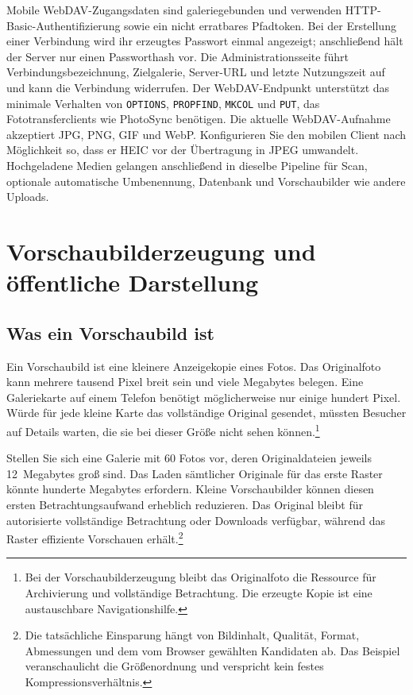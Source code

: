 \documentclass[11pt,a4paper]{article}
\newcommand{\codeword}[1]{\nolinkurl{#1}}
\begin{document}
Mobile WebDAV-Zugangsdaten sind galeriegebunden und verwenden
HTTP-Basic-Authen\-tifizierung sowie ein nicht erratbares Pfadtoken. Bei der
Erstellung einer Verbindung wird ihr erzeugtes Passwort einmal angezeigt;
anschließend hält der Server nur einen Passworthash vor. Die
Administrationsseite führt Verbindungsbezeichnung, Zielgalerie, Server-URL und
letzte Nutzungszeit auf und kann die Verbindung widerrufen. Der WebDAV-Endpunkt
unterstützt das minimale Verhalten von \codeword{OPTIONS}, \codeword{PROPFIND},
\codeword{MKCOL} und \codeword{PUT}, das Fototransferclients wie PhotoSync
benötigen. Die aktuelle WebDAV-Aufnahme akzeptiert JPG, PNG, GIF und WebP.
Konfigurieren Sie den mobilen Client nach Möglichkeit so, dass er HEIC vor der
Übertragung in JPEG umwandelt. Hochgeladene Medien gelangen anschließend in
dieselbe Pipeline für Scan, optionale automatische Umbenennung, Datenbank und
Vorschaubilder wie andere Uploads.
\section{Vorschaubilderzeugung und öffentliche Darstellung}
\label{sec:thumbnails}

\subsection{Was ein Vorschaubild ist}

Ein Vorschaubild ist eine kleinere Anzeigekopie eines Fotos. Das Originalfoto
kann mehrere tausend Pixel breit sein und viele Megabytes belegen. Eine
Galeriekarte auf einem Telefon benötigt möglicherweise nur einige hundert Pixel.
Würde für jede kleine Karte das vollständige Original gesendet, müssten Besucher
auf Details warten, die sie bei dieser Größe nicht sehen können.\footnote{Bei
der Vorschaubilderzeugung bleibt das Originalfoto die Ressource für Archivierung
und vollständige Betrachtung. Die erzeugte Kopie ist eine austauschbare
Navigationshilfe.}

Stellen Sie sich eine Galerie mit 60 Fotos vor, deren Originaldateien jeweils
12~Megabytes groß sind. Das Laden sämtlicher Originale für das erste Raster
könnte hunderte Megabytes erfordern. Kleine Vorschaubilder können diesen ersten
Betrachtungsaufwand erheblich reduzieren. Das Original bleibt für autorisierte
vollständige Betrachtung oder Downloads verfügbar, während das Raster effiziente
Vorschauen erhält.\footnote{Die tatsächliche Einsparung hängt von Bildinhalt,
Qualität, Format, Abmessungen und dem vom Browser gewählten Kandidaten ab. Das
Beispiel veranschaulicht die Größenordnung und verspricht kein festes
Kompressionsverhältnis.}
\end{document}
